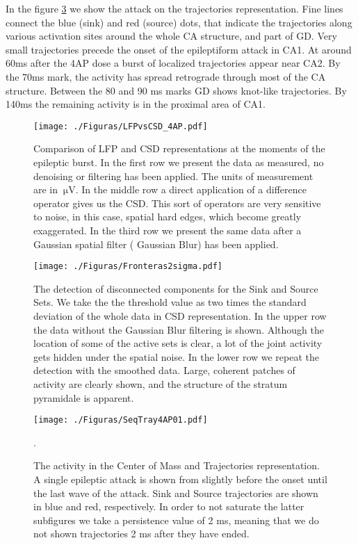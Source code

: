 \documentclass[12pt, letterpaper]{article}
\newcommand{\muV}[1]{\SI{#1}{\micro\volt}}
\begin{document}
In the figure \ref{tray4ap} we show the attack on the trajectories representation. Fine lines
connect the blue (sink) and red (source) dots, that indicate the trajectories along various activation
sites around the whole CA structure, and part of GD. Very small trajectories precede
the onset of the epileptiform attack in CA1. At around 60ms after the 4AP dose a burst
of localized trajectories appear near CA2. By the 70ms mark, the activity has spread
retrograde through most of the CA structure. Between the 80 and 90 ms marks
GD shows knot-like trajectories. By 140ms the remaining activity is in the proximal
area of CA1.




\begin{figure}
  \texttt{[image: ./Figuras/LFPvsCSD\_4AP.pdf]}
  \caption{Comparison of LFP and CSD representations
    at the moments of the epileptic burst. In the first row
    we present the data as measured, no denoising or filtering has
    been applied. The units of measurement are in $\muV{}$. In
    the middle row a direct application of a difference operator
    gives us the CSD. This sort of operators are very sensitive
    to noise, in this case, spatial hard edges, which become
    greatly exaggerated. In the third row we present the same
    data after a Gaussian spatial filter ( Gaussian Blur) has
    been applied. }\label{lfpycsd4ap}
\end{figure}

\begin{figure}
  \texttt{[image: ./Figuras/Fronteras2sigma.pdf]}
  \caption{The detection of disconnected components for the Sink and Source
    Sets. We take the the threshold value as two times the
    standard deviation of the whole data in CSD representation. In
    the upper row the data without the Gaussian Blur filtering is shown.
    Although the location of some of the active sets is clear, a lot of the
    joint activity gets hidden under the spatial noise. In the lower
    row we repeat the detection with the smoothed data. Large, coherent
    patches of activity are clearly shown, and the structure of the
    stratum pyramidale is apparent. 
  }\label{csdfrontera}
\end{figure}


\begin{figure}
  \texttt{[image: ./Figuras/SeqTray4AP01.pdf]}
  \caption{ The activity in the Center of Mass and Trajectories representation.
    A single epileptic attack is shown from slightly before the onset until the
    last wave of the attack. Sink and Source trajectories are shown in blue
    and red, respectively. In order to not saturate the latter subfigures
    we take a persistence value of 2 ms, meaning that we do not shown
    trajectories 2 ms after they have ended.}\label{tray4ap}.
 \end{figure}
\end{document}

